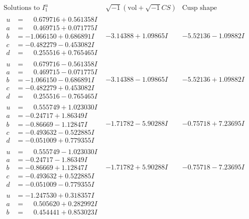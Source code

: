 \documentclass[1p]{elsarticle_modified}
\theoremstyle{definition}
\newcommand{\I}{\sqrt{-1}}
\begin{document}
$$\begin{array}{c|c|c}  
\text{Solutions to }I^u_{1}& \I (\text{vol} + \sqrt{-1}CS) & \text{Cusp shape}\\
 \hline 
\begin{aligned}
u &= \phantom{-}0.679716 + 0.561358 I \\
a &= \phantom{-}0.469715 + 0.071775 I \\
b &= -1.066150 + 0.686891 I \\
c &= -0.482279 - 0.453082 I \\
d &= \phantom{-}0.255516 + 0.765465 I\end{aligned}
 & -3.14388 + 1.09865 I & -5.52136 - 1.09882 I \\ \hline\begin{aligned}
u &= \phantom{-}0.679716 - 0.561358 I \\
a &= \phantom{-}0.469715 - 0.071775 I \\
b &= -1.066150 - 0.686891 I \\
c &= -0.482279 + 0.453082 I \\
d &= \phantom{-}0.255516 - 0.765465 I\end{aligned}
 & -3.14388 - 1.09865 I & -5.52136 + 1.09882 I \\ \hline\begin{aligned}
u &= \phantom{-}0.555749 + 1.023030 I \\
a &= -0.24717 + 1.86349 I \\
b &= -0.86669 - 1.12847 I \\
c &= -0.493632 - 0.522885 I \\
d &= -0.051009 + 0.779355 I\end{aligned}
 & -1.71782 - 5.90288 I & -0.75718 + 7.23695 I \\ \hline\begin{aligned}
u &= \phantom{-}0.555749 - 1.023030 I \\
a &= -0.24717 - 1.86349 I \\
b &= -0.86669 + 1.12847 I \\
c &= -0.493632 + 0.522885 I \\
d &= -0.051009 - 0.779355 I\end{aligned}
 & -1.71782 + 5.90288 I & -0.75718 - 7.23695 I \\ \hline\begin{aligned}
u &= -1.247530 + 0.318357 I \\
a &= \phantom{-}0.505620 + 0.282992 I \\
b &= \phantom{-}0.454441 + 0.853023 I \\

\end{aligned}
\end{array}$$
\end{document}
